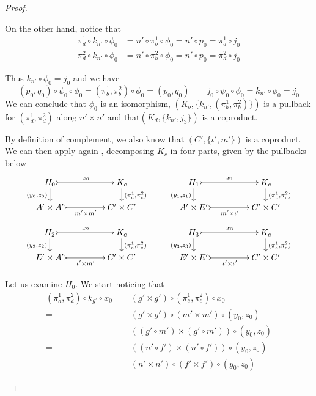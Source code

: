 \documentclass[3p]{elsarticle}
\theoremstyle{remark}
\theoremstyle{definition}
\begin{document}
\begin{proof}
\begin{enumerate}
{ On the other hand, notice that 
 \begin{align*}
 \pi^1_{d}\circ k_{n'}\circ \phi_0&=n'\circ \pi^1_b\circ \phi_0=n'\circ p_0=\pi^1_d\circ j_0 \\
 \pi^2_{d}\circ k_{n'}\circ \phi_0&=n'\circ \pi^2_b\circ \phi_0=n'\circ p_0=\pi^2_d\circ j_0
 \end{align*}

  Thus $k_{n'}\circ \phi_0=j_0$ and we have
 \[(p_0, q_0)\circ \psi_0\circ \phi_0=(\pi^1_b, \pi^2_b)\circ \phi_0=(p_0, q_0) \qquad  j_0\circ \psi_0\circ \phi_0 = k_{n'}\circ \phi_0=j_0\]
We can conclude that $\phi_0$ is an isomorphism, $(K_b, \{k_{n'}, (\pi^1_b, \pi^2_b)\})$ is a pullback for $(\pi^1_d, \pi^2_d)$ along $n'\times n'$ and  that$(K_d, \{k_{n'}, j_3\})$ is a coproduct.}
 
By definition of complement, we also know that $(C', \{\iota', m'\})$ is a coproduct. We can then apply again , decomposing $K_c$ in four parts, given by the pullbacks below
 \[\xymatrix@C=45pt@R=15pt{H_0 \ar@{>->}[r]^{x_0}  \ar[d]_{(y_0, z_0)}& K_c   \ar[d]^{(\pi^1_c, \pi^2_c)}& H_1 \ar@{>->}[r]^{x_1}  \ar[d]_{(y_1, z_1)} & K_c \ar[d]^{(\pi^1_c, \pi^2_c)} \\
 	A'\times A' \ar@{>->}[r]_-{m'\times m'} & C'\times C' & A'\times E' \ar@{>->}[r]_-{m'\times  \iota'} & C'\times C'}\]
 \[ \xymatrix@C=45pt@R=15pt{H_2 \ar@{>->}[r]^{x_2}  \ar[d]_{(y_2, z_2)}& K_c   \ar[d]^{(\pi^1_c, \pi^2_c)}& H_3 \ar@{>->}[r]^{x_3}  \ar[d]_{(y_3, z_3)} & K_c \ar[d]^{(\pi^1_c, \pi^2_c)} \\
 	E'\times A' \ar@{>->}[r]_-{\iota' \times m'} & C'\times C' & E'\times E' \ar@{>->}[r]_-{ \iota'\times  \iota'} & C'\times C'}\]
 
 \noindent
\parbox{7cm}{ Let us examine $H_0$. We start noticing that 
 \begin{align*}
 	(\pi^1_d, \pi^2_d)\circ k_{g'}\circ x_0=&(g'\times g')\circ(\pi^1_c, \pi^2_c)\circ x_0\\=&(g'\times g')\circ (m'\times m')\circ (y_0, z_0)\\=&((g'\circ m')\times (g'\circ m'))\circ (y_0, z_0)\\=&((n'\circ f')\times (n'\circ f'))\circ (y_0, z_0)\\=&(n'\times n')\circ (f'\times f')\circ (y_0, z_0) \end{align*}}\hfill \parbox{5cm}{}
 

\end{enumerate}
\end{proof}
\end{document}
